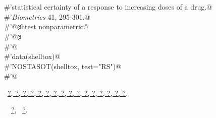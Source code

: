 \documentclass[reqno]{amsart}
\renewcommand{\NWlink}[2]{\hyperlink{#1}{#2}}
\begin{document}
\begin{flushleft}
\begin{list}{}{}
\mbox{}\verb@#'statistical certainty of a response to increasing doses of a drug.@\\
\mbox{}\verb@#'\emph{Biometrics} 41, 295-301.@\\
\mbox{}\verb@#'@{\tt @}\verb@keywords htest nonparametric@\\
\mbox{}\verb@#'@{\tt @}\verb@examples@\\
\mbox{}\verb@#'@\\
\mbox{}\verb@#'data(shelltox)@\\
\mbox{}\verb@#'NOSTASOT(shelltox, test="RS")@\\
\mbox{}\verb@#'@\\
\mbox{}\verb@@{\NWsep}
\end{list}
\vspace{-1.5ex}
\footnotesize
\begin{list}{}{\setlength{\itemsep}{-\parsep}\setlength{\itemindent}{-\leftmargin}}
\item \NWtxtFileDefBy\ \NWlink{nuweb?}{?}\NWlink{nuweb?}{, ?}\NWlink{nuweb?}{, ?}\NWlink{nuweb?}{, ?}\NWlink{nuweb?}{, ?}\NWlink{nuweb?}{, ?}\NWlink{nuweb?}{, ?}\NWlink{nuweb?}{, ?}\NWlink{nuweb?}{, ?}\NWlink{nuweb?}{, ?}\NWlink{nuweb?}{, ?}\NWlink{nuweb?}{, ?}\NWlink{nuweb?}{, ?}\NWlink{nuweb?}{, ?}\NWlink{nuweb?}{, ?}\NWlink{nuweb?}{, ?}.
\item \NWtxtIdentsUsed\nobreak\  \verb@NOSTASOT@\nobreak\ \NWlink{nuweb?}{?}, \verb@soControl@\nobreak\ \NWlink{nuweb?}{?}.
\item{}
\end{list}
\vspace{4ex}
\end{flushleft}
\end{document}
